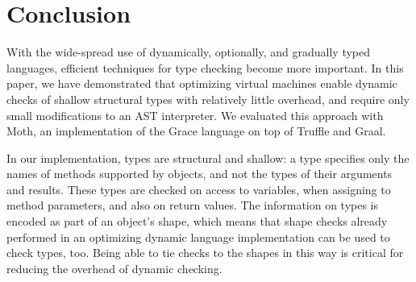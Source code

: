 
\section{Conclusion}
\label{sec:conclusion}

With the wide-spread use of dynamically, optionally, and gradually
typed languages, efficient techniques for  type checking
become more important.
%
%
%
%
%
%
In this paper, we have demonstrated that optimizing virtual machines enable
dynamic checks of shallow structural types with relatively little
overhead, and require only small modifications to an AST interpreter.
We evaluated this approach with Moth, an implementation of the Grace language
on top of Truffle and Graal.
%
%
%

In our implementation, types are structural and shallow: a type
specifies only the names of methods supported by objects, and not
the types of their arguments and results.
These types are checked on access to variables,
when assigning to method parameters, and also on return values.
The information on types is encoded as part of an object's shape,
which means that shape checks already performed in an optimizing dynamic
language implementation can be used to check types, too. 
Being able to tie checks to the shapes in this way is critical for 
reducing the overhead of dynamic checking.
%

